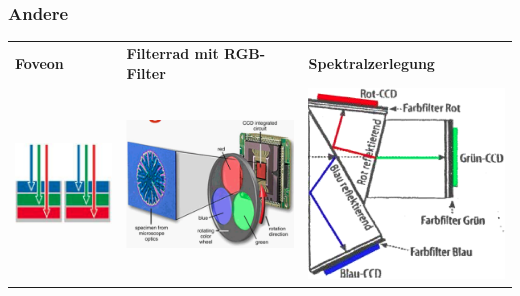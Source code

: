 \documentclass[10pt]{article}
\begin{document}
\subsubsection*{Andere}
\begin{tabular}{l l l}
	\textbf{Foveon} & \textbf{Filterrad mit RGB-Filter} & \textbf{Spektralzerlegung} \\
	\includegraphics[scale=0.7]{foveon.png} & \includegraphics[scale=0.4]{Filterrad-mit-RGB-Filter.png} & \includegraphics[scale=0.4]{spektralzerlegung.png}
\end{tabular}
\end{document}
